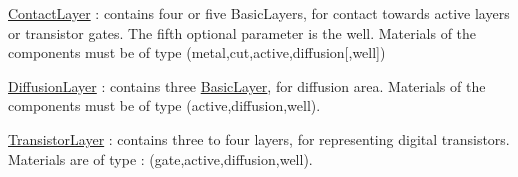 \begin{DoxyItemize}
\begin{DoxyItemize}
\item \mbox{\hyperlink{classHurricane_1_1ContactLayer}{Contact\+Layer}} \+: contains four or five Basic\+Layers, for contact towards active layers or transistor gates. The fifth optional parameter is the well. Materials of the components must be of type {\ttfamily }(metal,cut,active,diffusion\mbox{[},well\mbox{]}) 
\item \mbox{\hyperlink{classHurricane_1_1DiffusionLayer}{Diffusion\+Layer}} \+: contains three \mbox{\hyperlink{classHurricane_1_1BasicLayer}{Basic\+Layer}}, for diffusion area. Materials of the components must be of type {\ttfamily }(active,diffusion,well). 
\item \mbox{\hyperlink{classHurricane_1_1TransistorLayer}{Transistor\+Layer}} \+: contains three to four layers, for representing digital transistors. Materials are of type \+: {\ttfamily }(gate,active,diffusion,well). 
\end{DoxyItemize}
\end{DoxyItemize}

